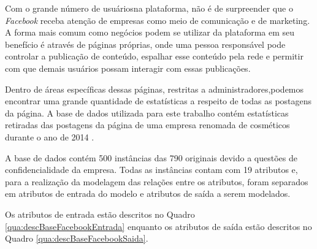 Com o grande número de usuáriosna plataforma, não é de surpreender que o \textit{Facebook} receba atenção de empresas como meio de comunicação e de marketing. A forma mais comum como negócios podem se utilizar da plataforma em seu benefício é através de páginas próprias, onde uma pessoa responsável pode controlar a publicação de conteúdo, espalhar esse conteúdo pela rede e permitir com que demais usuários possam interagir com essas publicações.

Dentro de áreas específicas dessas páginas, restritas a administradores,podemos encontrar uma grande quantidade de estatísticas a respeito de todas as postagens da página. A base de dados utilizada para este trabalho contém estatísticas retiradas das postagens da página de uma empresa renomada de cosméticos durante o ano de 2014 .

A base de dados contém 500 instâncias das 790 originais devido a questões de confidencialidade da empresa. Todas as instâncias contam com 19 atributos e, para a realização da modelagem das relações entre os atributos, foram separados em atributos de entrada do modelo e atributos de saída a serem modelados.

Os atributos de entrada estão descritos no Quadro \ref{qua:descBaseFacebookEntrada} enquanto os atributos de saída estão descritos no Quadro \ref{qua:descBaseFacebookSaida}.



